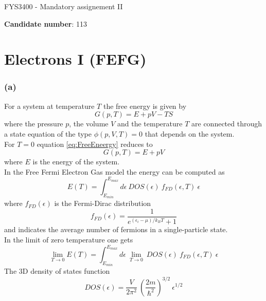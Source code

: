 \documentclass{article}
\begin{document}
\begin{center}
    \centerline{\LARGE FYS3400 - Mandatory assignement II}
    \vspace{10pt}
    \centerline{\large\textbf{Candidate number}: 113}
\end{center}

\section{Electrons I (FEFG)}

\subsubsection*{(a)}
For a system at temperature $T$ the free energy is given by 
\begin{equation}
    G(p, T) = E + pV - TS
    \label{eq:FreeEneergy}
\end{equation}
where the pressure $p$, the volume $V$ and the temperature $T$ are connected through a state equation of the type $\phi(p, V, T) = 0$ that depends
on the system. \\
For $T=0$ equation \ref{eq:FreeEneergy} reduces to
\begin{equation}
    G(p, T) = E + pV
\end{equation}
where $E$ is the energy of the system. \\
In the Free Fermi Electron Gas model the energy can be computed as
\begin{equation}
    E(T) = \int_{E_{min}}^{E_{max}} d\epsilon \ DOS(\epsilon) \ f_{FD}(\epsilon, T) \ \epsilon 
\end{equation}
where $f_{FD}(\epsilon)$ is the Fermi-Dirac distribution 
\begin{equation*}
    f_{FD}(\epsilon) = \frac{1}{e^{(\epsilon_i - \mu)/k_B T} + 1}
\end{equation*}
and indicates the average number of fermions in a single-particle state. \\
In the limit of zero temperature one gets
\begin{equation}
    \lim_{T \to 0} E(T) = \int_{E_{min}}^{E_{max}} d\epsilon \ \lim_{T \to 0} \ DOS(\epsilon) \ f_{FD}(\epsilon, T) \ \epsilon
    \label{eq:energy_FEFG}
\end{equation}
The 3D density of states function 
\begin{equation}
    DOS(\epsilon) = \frac{V}{2\pi^2} \ \left(\frac{2m}{\hbar^2}\right)^{3/2} \ \epsilon^{1/2}
\end{equation}
\end{document}

